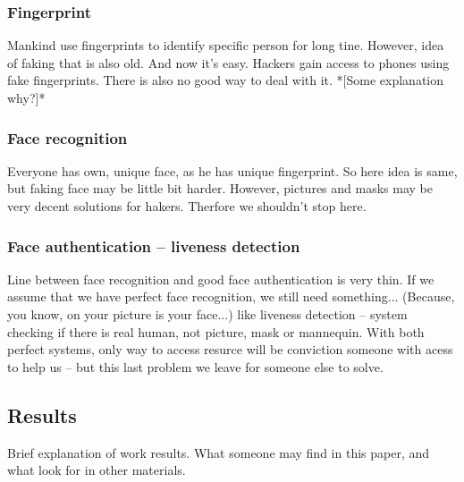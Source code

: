         \subsubsection*{Fingerprint}
            Mankind use fingerprints to identify specific person
            for long tine. %
            However, idea of faking that is also old. %
            And now it's easy. %
            Hackers gain access to phones
            using fake fingerprints. %
            There is also no good way
            to deal with it.
            *[Some explanation why?]* %

        \subsubsection{Face recognition}
            Everyone has own, unique face, as he has unique fingerprint.
            So here idea is same,
            but faking face may be little bit harder.
            However, pictures and masks may be very decent solutions
            for hakers. %
            Therfore we shouldn't stop here.

        \subsubsection{Face authentication -- liveness detection}
            Line between face recognition and
            good face authentication is very thin.
            If we assume that we have perfect face recognition,
            we still need something... (Because, you know, on your picture is your face...)
            like liveness detection --
            system checking if there is real human, not picture, mask or mannequin.
            With both perfect systems, only way to access resurce will be
            conviction someone with acess to help us -- but this last problem
            we leave for someone else to solve.

    \subsection{Results}
        Brief explanation of work results.
        What someone may find in this paper,
        and what look for in other materials.
